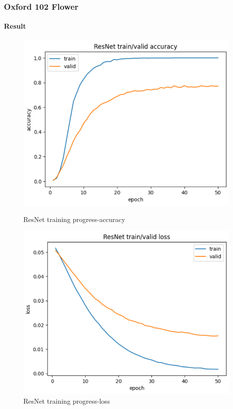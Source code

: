 \documentclass[
	11pt, %
	aspectratio=169, %
]{beamer}
\begin{document}
\begin{frame}
	\frametitle{Oxford 102 Flower}
	\framesubtitle{Result}

	\begin{figure}[htbp]
		\begin{minipage}[t]{0.48\textwidth}
			\includegraphics[width=1.0\linewidth]{resnet_accuracy.png}
			\caption{ResNet training progress-accuracy}
		\end{minipage}
		\begin{minipage}[t]{0.48\textwidth}
			\includegraphics[width=1.0\linewidth]{resnet_loss.png}
			\caption{ResNet training progress-loss}
		\end{minipage}
	\end{figure}

\end{frame}
\end{document}
